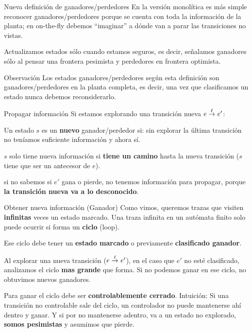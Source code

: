 \begin{frame}{Nueva definición de ganadores/perdedores}
    En la versión monolítica es más simple reconocer ganadores/perdedores porque se cuenta con toda la información de la planta; en on-the-fly debemos ``imaginar'' a dónde van a parar las transiciones no vistas.
    
    Actualizamos estados sólo cuando estamos seguros, es decir, señalamos ganadores sólo al pensar una frontera pesimista y perdedores en frontera optimista.
    
    \begin{block}{Observación}
        Los estados ganadores/perdedores según esta definición son ganadores/perdedores en la planta completa, es decir, una vez que clasificamos un estado nunca debemos reconsiderarlo.
    \end{block}
\end{frame}
\begin{frame}{Propagar información}
	Si estamos explorando una transición nueva $e \overset{\ell}{\rightarrow}_{} e'$:
	
	\pause
	
	Un estado $s$ es un \textbf{nuevo} ganador/perdedor si: sin explorar la última transición no teníamos suficiente información y ahora sí.
	
	\pause
	
	$s$ solo tiene nueva información si \textbf{tiene un camino} hasta la nueva transición ($s$ tiene que ser un antecesor de $e$).
	
	\pause 
	
	si no sabemos si $e'$ gana o pierde, no tenemos información para propagar, porque \textbf{la transición nueva va a lo desconocido}.

\end{frame}
\begin{frame}{Obtener nueva información (Ganador)}
	Como vimos, queremos trazas que visiten \textbf{infinitas} veces un estado marcado. \pause Una traza infinita en un autómata finito solo puede ocurrir si forma un \textbf{ciclo} (loop).
	
	\pause
		
	Ese ciclo debe tener un \textbf{estado marcado} o previamente \textbf{clasificado ganador}.
	
	\pause
	
	Al explorar una nueva transición ($e \overset{\ell}{\rightarrow}_{} e'$), en el caso que $e'$ no esté clasificado, analizamos el ciclo \textbf{mas grande} que forma. Si no podemos ganar en ese ciclo, no obtuvimos nuevos ganadores.
	
	\pause

	Para ganar el ciclo debe ser \textbf{controlablemente cerrado}. Intuición: Si una transición no controlable sale del ciclo, un controlador no puede mantenerse ahí dentro y ganar. Y si por no mantenerse adentro, va a un estado no explorado, \textbf{somos pesimistas} y asumimos que pierde.
\end{frame}
